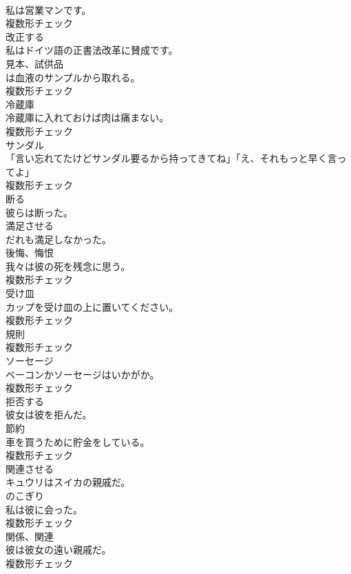 \documentclass[8pt]{extreport}
\begin{document}
\begin{CJK}{UTF8}{min}
\\	私は営業マンです。	
\\	複数形チェック
\\	[動詞]	改正する	
\\	私はドイツ語の正書法改革に賛成です。	
\\	[名詞]	見本、試供品	
\\	は血液のサンプルから取れる。	
\\	複数形チェック
\\	[名詞]	冷蔵庫	
\\	冷蔵庫に入れておけば肉は痛まない。	
\\	複数形チェック
\\	[名詞]	サンダル	
\\	「言い忘れてたけどサンダル要るから持ってきてね」「え、それもっと早く言ってよ」	
\\	複数形チェック
\\	[動詞]	断る	
\\	彼らは断った。	
\\	[動詞]	満足させる	
\\	だれも満足しなかった。	
\\	[名詞]	後悔、悔恨	
\\	我々は彼の死を残念に思う。	
\\	複数形チェック
\\	[名詞]	受け皿	
\\	カップを受け皿の上に置いてください。	
\\	複数形チェック
\\	[名詞]	規則	
\\	複数形チェック
\\	[名詞]	ソーセージ	
\\	ベーコンかソーセージはいかがか。	
\\	複数形チェック
\\	[動詞]	拒否する	
\\	彼女は彼を拒んだ。	
\\	[名詞]	節約	
\\	車を買うために貯金をしている。	
\\	複数形チェック
\\	[動詞]	関連させる	
\\	キュウリはスイカの親戚だ。	
\\	[名詞]	のこぎり	
\\	私は彼に会った。	
\\	複数形チェック
\\	[名詞]	関係、関連	
\\	彼は彼女の遠い親戚だ。	
\\	複数形チェック

\end{CJK}
\end{document}
